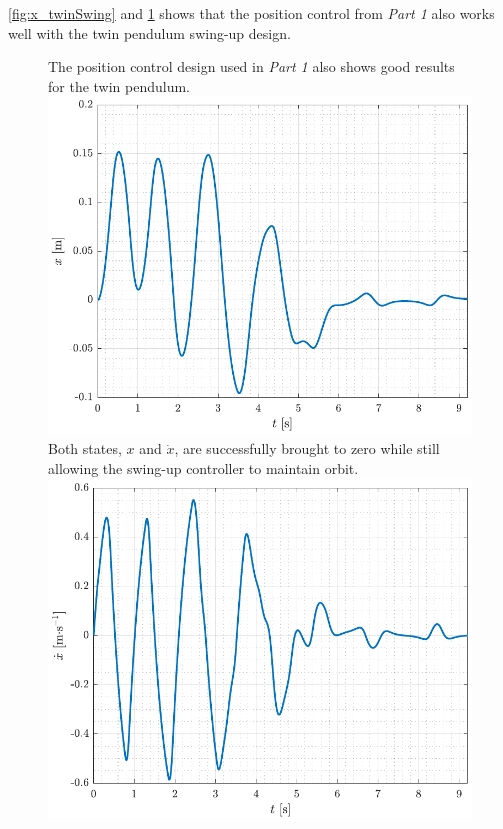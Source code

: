 %
\autoref{fig:x_twinSwing} and \ref{fig:xDot_twinSwing} shows that the position control from \textit{Part 1} also works well with the twin pendulum swing-up design.
\begin{figure}[H]
  \hspace{-10pt}
  \captionbox
  {
    The position control design used in \textit{Part 1} also shows good results for the twin pendulum.
    \label{fig:x_twinSwing}
  }
  {
    \hspace{-1cm}
    \includegraphics[width=.4\textwidth]{figures/x_twinSwing}
  }
  \hspace{20pt}
  \captionbox 
  {
    Both states, $x$ and $\dot{x}$, are successfully brought to zero while still allowing the swing-up controller to maintain orbit.
    \label{fig:xDot_twinSwing}
  }
  {
    \hspace{-1cm}
    \includegraphics[width=.4\textwidth]{figures/xDot_twinSwing}
  }  
\end{figure}
%
%
